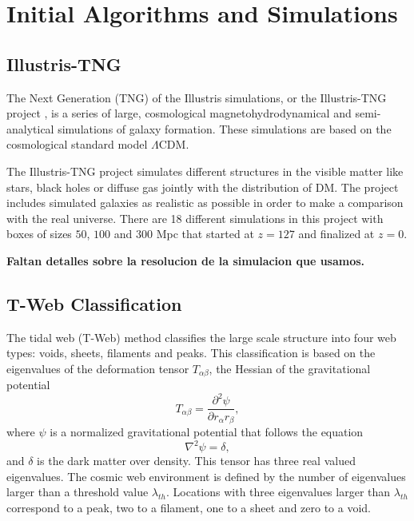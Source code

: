 \documentclass[usenatbib]{mnras}
\begin{document}
\section{Initial Algorithms and Simulations}\label{sec:init}

\subsection{Illustris-TNG}

The Next Generation (TNG) of the Illustris simulations, or the
Illustris-TNG project \citep{Nelson2015},  is a series of large,
cosmological magnetohydrodynamical and semi-analytical simulations of
galaxy formation. 
These simulations are based on the cosmological standard model
$\Lambda$CDM.  

The Illustris-TNG project simulates different structures in the
visible matter like stars, black holes or diffuse gas jointly with the
distribution of DM.
The project includes simulated galaxies as realistic as possible in
order to make a comparison with the real universe. There are 18
different simulations in this project with boxes of sizes $50$, $100$ and
$300$ Mpc that started at $z=127$ and finalized at $z=0$.   

\textbf{Faltan detalles sobre la resolucion de la simulacion que usamos.}

\subsection{T-Web Classification}

The tidal web (T-Web) method \citep{Hahn2007,Forero-Romero2009}
classifies the large scale structure into four web types: voids,
sheets, filaments and peaks.   
This classification is based on the eigenvalues of the deformation
tensor $T_{\alpha\beta}$, the Hessian of the gravitational potential 
\begin{equation}
T_{\alpha\beta}=\frac{\partial^2\psi}{\partial r_{\alpha}r_{\beta}},
\end{equation}
%
where $\psi$ is a normalized gravitational potential that follows the equation
\begin{equation}
    \nabla^2 \psi = \delta,
\end{equation}
%
and $\delta$ is the dark matter over density.
This tensor has three real valued eigenvalues. 
The cosmic web environment is defined by the number of eigenvalues
larger than a threshold value $\lambda_{th}$.
Locations with three eigenvalues larger than $\lambda_{th}$ correspond
to a peak, two to a filament, one to a sheet and zero to a void. 
\end{document}
